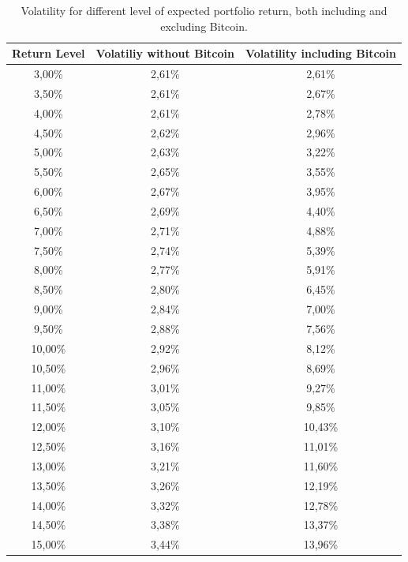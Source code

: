 \begin{table}
\begin{tabular}{ccc}
	\toprule
	Return Level & Volatiliy without Bitcoin & Volatility including Bitcoin \\
	\midrule
	3,00\% & 2,61\% & 2,61\% \\
	3,50\% & 2,61\% & 2,67\% \\
	4,00\% & 2,61\% & 2,78\% \\
	4,50\% & 2,62\% & 2,96\% \\
	5,00\% & 2,63\% & 3,22\% \\
	5,50\% & 2,65\% & 3,55\% \\
	6,00\% & 2,67\% & 3,95\% \\
	6,50\% & 2,69\% & 4,40\% \\
	7,00\% & 2,71\% & 4,88\% \\
	7,50\% & 2,74\% & 5,39\% \\
	8,00\% & 2,77\% & 5,91\% \\
	8,50\% & 2,80\% & 6,45\% \\
	9,00\% & 2,84\% & 7,00\% \\
	9,50\% & 2,88\% & 7,56\% \\
	10,00\% & 2,92\% & 8,12\% \\
	10,50\% & 2,96\% & 8,69\% \\
	11,00\% & 3,01\% & 9,27\% \\
	11,50\% & 3,05\% & 9,85\% \\
	12,00\% & 3,10\% & 10,43\% \\
	12,50\% & 3,16\% & 11,01\% \\
	13,00\% & 3,21\% & 11,60\% \\
	13,50\% & 3,26\% & 12,19\% \\
	14,00\% & 3,32\% & 12,78\% \\
	14,50\% & 3,38\% & 13,37\% \\
	15,00\% & 3,44\% & 13,96\% \\
	\bottomrule
\end{tabular}
\caption{Volatility for different level of expected portfolio return, both including and excluding Bitcoin.}
\label{tab:markowitz_vol_on_ret}
\end{table}


